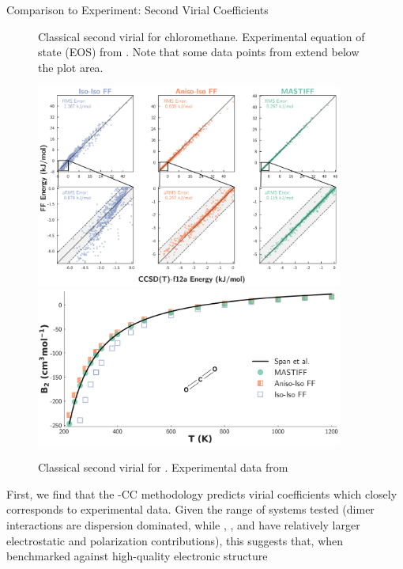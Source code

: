 \begin{subsection}{Comparison to Experiment: Second Virial Coefficients}
\begin{figure}[ht]
    \caption{
        Classical second virial for chloromethane. Experimental equation of
        state (EOS) from .
        Note that some data points from \isoff extend below the plot area.
            }
    \label{fig:chloromethane_virial}
    \end{figure}
    \begin{figure}[ht]
    \includegraphics[width=0.9\textwidth]{anisotropic/scatterplots/co2_co2_comparison.pdf}
    \includegraphics[width=0.9\textwidth]{anisotropic/virials/co2/co2_2nd_virial.pdf}
    \caption{
        Classical second virial for \co. 
        Experimental data from 
            }
    \label{fig:co2_virial}
    \end{figure}
%
First,
we find that the \mastiff-CC
methodology predicts virial coefficients
which closely corresponds to experimental data. Given the range of systems
tested (\co dimer interactions are dispersion dominated, while \cl, \nh, and
\ho have relatively larger electrostatic and polarization contributions), 
this suggests that, when benchmarked against high-quality electronic structure

\end{subsection}
